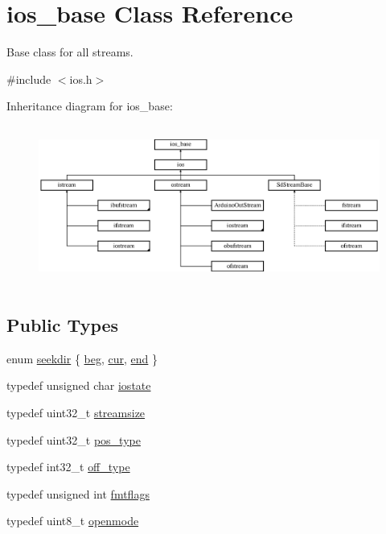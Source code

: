 \hypertarget{classios__base}{\section{ios\-\_\-base Class Reference}
\label{classios__base}
}


Base class for all streams.  




{\ttfamily \#include $<$ios.\-h$>$}

Inheritance diagram for ios\-\_\-base\-:\begin{figure}[H]
\begin{center}
\leavevmode
\includegraphics[height=5.268817cm]{classios__base}
\end{center}
\end{figure}
\subsection*{Public Types}
\begin{DoxyCompactItemize}
\item 
enum \hyperlink{classios__base_a5cca6e21eff1a334d30776a5a0f1c5e2}{seekdir} \{ \hyperlink{classios__base_a5cca6e21eff1a334d30776a5a0f1c5e2a6be01d1a6ad11cbcf2b78e0c7e55b896}{beg}, 
\hyperlink{classios__base_a5cca6e21eff1a334d30776a5a0f1c5e2a838f1611fa9fbab711265108c9842152}{cur}, 
\hyperlink{classios__base_a5cca6e21eff1a334d30776a5a0f1c5e2a80b1a820e533d7cf0e1715319339e6d0}{end}
 \}
\item 
typedef unsigned char \hyperlink{classios__base_a67209c853f091390e1a08ac0b043fe11}{iostate}
\item 
typedef uint32\-\_\-t \hyperlink{classios__base_a4da0480b3f0f665fd27870782a6f7331}{streamsize}
\item 
typedef uint32\-\_\-t \hyperlink{classios__base_a0833e9c1b028d7389a319a3dd11290d3}{pos\-\_\-type}
\item 
typedef int32\-\_\-t \hyperlink{classios__base_aa302457dd4c50f113d997fbf785a4bda}{off\-\_\-type}
\item 
typedef unsigned int \hyperlink{classios__base_a975a829c0b5d999dd5bce3758b59da10}{fmtflags}
\item 
typedef uint8\-\_\-t \hyperlink{classios__base_a97a503456f60758f2c110f99b0ce0815}{openmode}
\end{DoxyCompactItemize}
